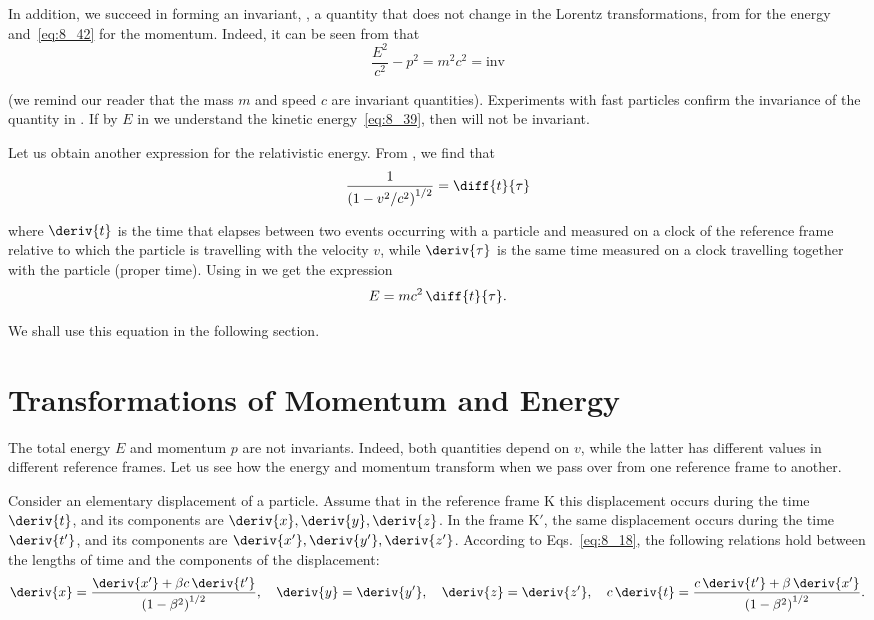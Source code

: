 In addition, we succeed in forming an invariant, \ie, a quantity that does not change in the Lorentz transformations, from  for the energy and~\eqref{eq:8_42} for the momentum. Indeed, it can be seen from  that
\begin{equation}\label{eq:8_45}
	\frac{E^2}{c^2} - p^2 = m^2c^2 = \text{inv}
\end{equation}

\noindent
(we remind our reader that the mass $m$ and speed $c$ are invariant quantities). Experiments with fast particles confirm the invariance of the quantity in . If by $E$ in  we understand the kinetic energy~\eqref{eq:8_39}, then  will not be invariant.

Let us obtain another expression for the relativistic energy. From , we find that
\begin{equation}\label{eq:8_46}
	\frac{1}{\left(1 - v^2/c^2\right)^{1/2}} = \diff{t}{\tau}
\end{equation}

\noindent
where $\deriv{t}$ is the time that elapses between two events occurring with a particle and measured on a clock of the reference frame relative to which the particle is travelling with the velocity $v$, while $\deriv{\tau}$ is the same time measured on a clock travelling together with the particle (proper time). Using  in  we get the expression
\begin{equation}\label{eq:8_47}
	E = mc^2\,\diff{t}{\tau}.
\end{equation}

\noindent
We shall use this equation in the following section.

\section{Transformations of Momentum and Energy}\label{sec:8_8}

The total energy $E$ and momentum $p$ are not invariants. Indeed, both quantities depend on $v$, while the latter has different values in different reference frames. Let us see how the energy and momentum transform when we pass over from one reference frame to another.

Consider an elementary displacement of a particle. Assume that in the reference frame K this displacement occurs during the time $\deriv{t}$, and its components are $\deriv{x}, \deriv{y}, \deriv{z}$. In the frame K$'$, the same displacement occurs during the time $\deriv{t'}$, and its components are $\deriv{x'}, \deriv{y'}, \deriv{z'}$. According to Eqs.~\eqref{eq:8_18}, the following relations hold between the lengths of time and the components of the displacement:
\begin{equation*}
	\deriv{x} = \frac{\deriv{x'}+\beta c\,\deriv{t'}}{\left(1 - \beta^2\right)^{1/2}},\quad \deriv{y}=\deriv{y'},\quad \deriv{z}=\deriv{z'},\quad c\,\deriv{t} = \frac{c\,\deriv{t'}+\beta\,\deriv{x'}}{\left(1 - \beta^2\right)^{1/2}}.
\end{equation*}

